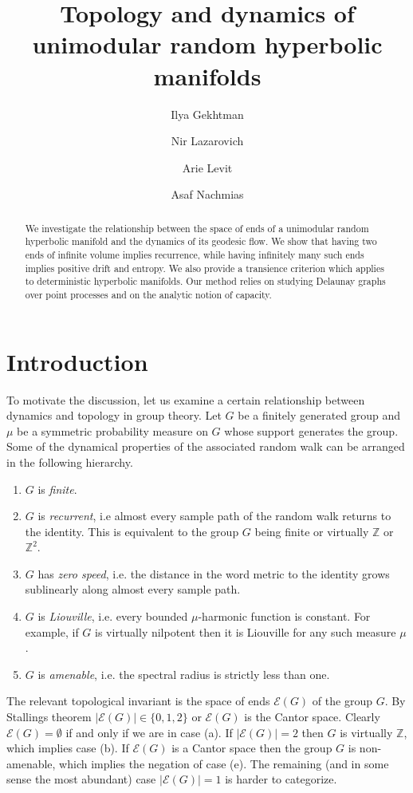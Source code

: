 \documentclass{amsart}
\title{Topology and dynamics of unimodular random hyperbolic manifolds}
\author{Ilya Gekhtman}
\author{Nir Lazarovich}
\author{Arie Levit}
\author{Asaf Nachmias}
\newcommand{\ZZ}{\mathbb{Z}}
\newcommand{\Ends}[1]{\mathcal{E}\left(#1\right)}
\theoremstyle{plain}
\numberwithin{equation}{section}
\theoremstyle{definition}
\begin{document}
\begin{abstract}
We investigate the relationship between the space of ends of a unimodular random hyperbolic manifold and the dynamics of its geodesic flow. 
We show that having two ends of infinite volume implies recurrence, while having infinitely many such ends implies positive drift and entropy. We also provide a transience criterion which applies to deterministic hyperbolic manifolds. Our method relies on studying Delaunay graphs over point processes and on the analytic notion of capacity.
\end{abstract}

\maketitle

\section{Introduction}
To motivate the discussion, let us examine a certain relationship between dynamics and topology in group theory. Let $G$ be a finitely generated group and $\mu$ be a symmetric probability measure on $G$ whose support generates the group. Some of the dynamical properties of the associated random walk can be arranged in the following hierarchy.

\begin{enumerate}[label=(\alph*),leftmargin=*]
\item $G$ is \emph{finite}.
\item $G$ is \emph{recurrent}, 
 i.e almost every sample path of the random walk returns to the identity. This is equivalent to the group $G$ being finite or virtually $\ZZ$ or $\ZZ^2$.
\item $G$ has \emph{zero speed}, i.e. the distance in the word metric to the identity grows sublinearly along almost every sample path.
\item $G$ is \emph{Liouville}, i.e. every bounded $\mu$-harmonic function is constant. For example, if $G$ is virtually nilpotent then it is Liouville for any such measure $\mu$. 
\item $G$ is \emph{amenable}, i.e. the spectral radius is strictly less than one.
\end{enumerate}

The relevant topological invariant is the space of ends $\Ends{G}$ of the group $G$. By Stallings theorem $|\Ends{G}| \in \{0,1,2\}$ or  $\Ends{G}$ is the Cantor space. Clearly $\Ends{G} = \emptyset$ if and only if we are in case (a). If $|\Ends{G}|=2$ then $G$ is virtually $\ZZ$, which implies case (b). If $\Ends{G}$ is a Cantor space then the group $G$ is non-amenable, which implies the negation of case (e).  The remaining (and in some sense the most abundant) case $|\Ends{G}| = 1$ is harder to categorize.
\end{document}
